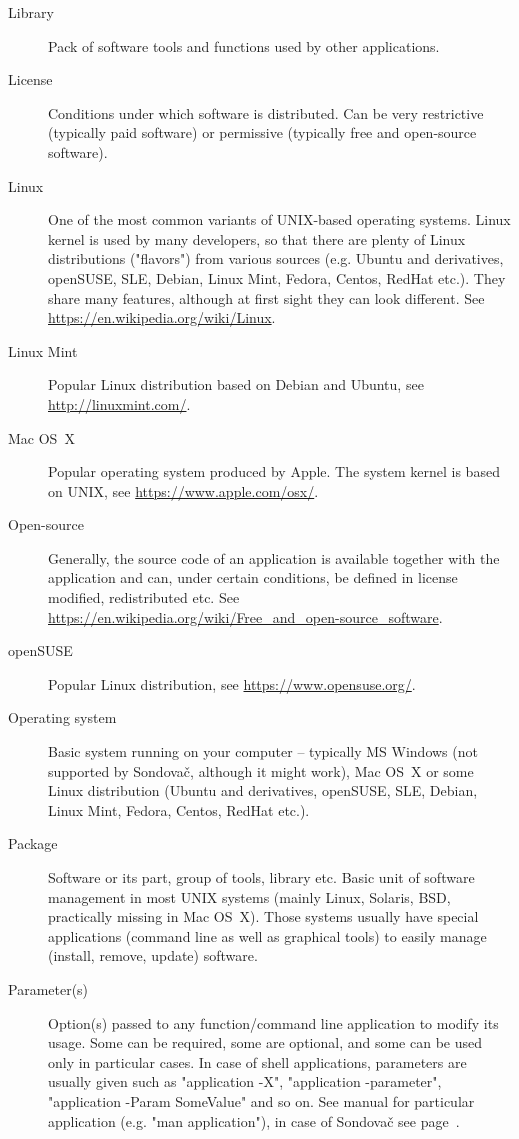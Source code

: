 \documentclass[a4paper, 11pt, twoside]{article}
\begin{document}
\begin{description}
  \item[Library] Pack of software tools and functions used by other applications.
  \item[License] Conditions under which software is distributed. Can be very restrictive (typically paid software) or permissive (typically free and open-source software).
  \item[Linux] One of the most common variants of UNIX-based operating systems. Linux kernel is used by many developers, so that there are plenty of Linux distributions ("flavors") from various sources (e.g. Ubuntu and derivatives, openSUSE, SLE, Debian, Linux Mint, Fedora, Centos, RedHat etc.). They share many features, although at first sight they can look different. See \url{https://en.wikipedia.org/wiki/Linux}.
  \item[Linux Mint] Popular Linux distribution based on Debian and Ubuntu, see \url{http://linuxmint.com/}.
  \item[Mac OS~X] Popular operating system produced by Apple. The system kernel is based on UNIX, see \url{https://www.apple.com/osx/}.
  \item[Open-source] Generally, the source code of an application is available together with the application and can, under certain conditions, be defined in license modified, redistributed etc. See \url{https://en.wikipedia.org/wiki/Free_and_open-source_software}.
  \item[openSUSE] Popular Linux distribution, see \url{https://www.opensuse.org/}.
  \item[Operating system] Basic system running on your computer -- typically MS Windows (not supported by Sondovač, although it might work), Mac OS~X or some Linux distribution (Ubuntu and derivatives, openSUSE, SLE, Debian, Linux Mint, Fedora, Centos, RedHat etc.).
  \item[Package] Software or its part, group of tools, library etc. Basic unit of software management in most UNIX systems (mainly Linux, Solaris, BSD, practically missing in Mac OS~X). Those systems usually have special applications (command line as well as graphical tools) to easily manage (install, remove, update) software.
  \item[Parameter(s)] Option(s) passed to any function/command line application to modify its usage. Some can be required, some are optional, and some can be used only in particular cases. In case of shell applications, parameters are usually given such as "application -X", "application -parameter", "application -Param SomeValue" and so on. See manual for particular application (e.g. "man application"), in case of Sondovač see page~\pageref{script-usage}.

\end{description}
\end{document}
